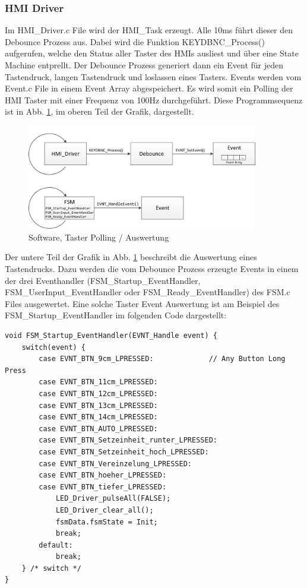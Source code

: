 \subsubsection{HMI Driver}
Im HMI\_Driver.c File wird der HMI\_Task erzeugt. Alle 10ms führt dieser den Debounce Prozess aus. Dabei wird die Funktion KEYDBNC\_Process() aufgerufen, welche den Status aller Taster des HMIs ausliest und über eine State Machine entprellt. Der Debounce Prozess generiert dann ein Event für jeden Tastendruck, langen Tastendruck und loslassen eines Tasters. Events werden vom Event.c File in einem Event Array abgespeichert. Es wird somit ein Polling der HMI Taster mit einer Frequenz von 100Hz durchgeführt. Diese Programmsequenz ist in Abb. \ref{fig:Taster_Polling}, im oberen Teil der Grafik, dargestellt.

\begin{figure}[H]
	\includegraphics[width=0.9\textwidth]{Illustrationen/6-Umsetzung/Taster_Polling.png}
	\caption{Software, Taster Polling / Auswertung}
	\label{fig:Taster_Polling}
\end{figure}

Der untere Teil der Grafik in Abb. \ref{fig:Taster_Polling} beschreibt die Auswertung eines Tastendrucks. Dazu werden die vom Debounce Prozess erzeugte Events in einem der drei Eventhandler (FSM\_Startup\_EventHandler, FSM\_UserInput\_EventHandler oder FSM\_Ready\_EventHandler) des FSM.c Files ausgewertet. Eine solche Taster Event Auswertung ist am Beispiel des FSM\_Startup\_EventHandler im folgenden Code dargestellt:

\begin{lstlisting}
void FSM_Startup_EventHandler(EVNT_Handle event) {
	switch(event) {
		case EVNT_BTN_9cm_LPRESSED:				// Any Button Long Press
		case EVNT_BTN_11cm_LPRESSED:
		case EVNT_BTN_12cm_LPRESSED:
		case EVNT_BTN_13cm_LPRESSED:
		case EVNT_BTN_14cm_LPRESSED:
		case EVNT_BTN_AUTO_LPRESSED:
		case EVNT_BTN_Setzeinheit_runter_LPRESSED:
		case EVNT_BTN_Setzeinheit_hoch_LPRESSED:
		case EVNT_BTN_Vereinzelung_LPRESSED:
		case EVNT_BTN_hoeher_LPRESSED:
		case EVNT_BTN_tiefer_LPRESSED:
			LED_Driver_pulseAll(FALSE);
			LED_Driver_clear_all();
			fsmData.fsmState = Init;
			break;
		default:
			break;
	} /* switch */
}
\end{lstlisting}

